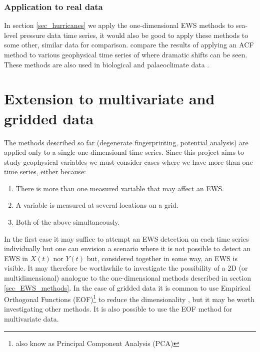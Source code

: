 \documentclass[11pt,a4paper,reqno]{article}
\numberwithin{equation}{section}
\begin{document}
\subsubsection{Application to real data}
\label{sec_realdata}

In section \ref{sec_hurricanes} we apply the one-dimensional EWS methods to sea-level pressure data time series, it would also be good to apply these methods to some other, similar data for comparison. \cite{dakos2012} compare the results of applying an ACF method to various geophysical time series of where dramatic shifts can be seen. These methods are also used in biological and palaeoclimate data \citep{scheffer2001, livina2011}. 


\section{Extension to multivariate and gridded data}
\label{sec_gridded}

The methods described so far (degenerate fingerprinting, potential analysis) are applied only to a single one-dimensional time series. Since this project aims to study geophysical variables we must consider cases where we have more than one time series, either because:
\begin{enumerate}
\item There is more than one measured variable that may affect an EWS.
\item A variable is measured at several locations on a grid. 
\item Both of the above simultaneously. 
\end{enumerate}
In the first case it may suffice to attempt an EWS detection on each time series individually but one can envision a scenario where it is not possible to detect an EWS in $X(t)$ nor $Y(t)$ but, considered together in some way, an EWS is visible. It may therefore be worthwhile to investigate the possibility of a 2D (or multidimensional) analogue to the one-dimensional methods described in section \ref{sec_EWS_methods}. In the case of gridded data it is common to use Empirical Orthogonal Functions (EOF)\footnote{also know as Principal Component Analysis (PCA)} to reduce the dimensionality \citep[Chapter~13]{vonstorch}, but it may be worth investigating other methods. It is also possible to use the EOF method for multivariate data.
\end{document}
